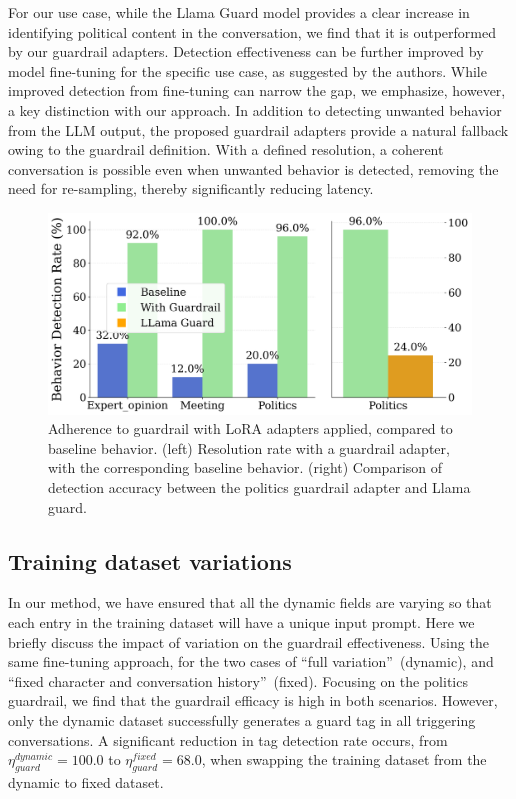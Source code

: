 \documentclass[letterpaper]{article}
\newcommand{\tagDetectionPoliticsFixed}{68.0}
\newcommand{\tagDetectionPolitics}{100.0}
\begin{document}
For our use case, while the Llama Guard model provides a clear increase in identifying political content in the conversation, we find that it is outperformed by our guardrail adapters.
Detection effectiveness can be further improved by model fine-tuning for the specific use case, as suggested by the authors. While improved detection from fine-tuning can narrow the gap, we emphasize, however, a key distinction with our approach. In addition to detecting unwanted behavior from the LLM output, the proposed guardrail adapters provide a natural fallback owing to the guardrail definition. With a defined resolution, a coherent conversation is possible even when unwanted behavior is detected, removing the need for re-sampling, thereby significantly reducing latency.

\begin{figure}[h!]
	\centering
	\includegraphics[width=1.0\linewidth]{figures/detectionEfficiencySingle.png}
	\caption{Adherence to guardrail with LoRA adapters applied, compared to baseline behavior. 
		(left)  Resolution rate with a guardrail adapter, with the corresponding baseline behavior. 
		(right)  Comparison of detection accuracy between the politics guardrail adapter and Llama guard.}\label{fig:llora-result}
\end{figure}
\subsection{Training dataset variations}
In our method, we have ensured that all the dynamic fields are varying so that each entry in the training dataset will have a unique input prompt. 
Here we briefly discuss the impact of variation on the guardrail effectiveness. 
Using the same fine-tuning approach, for the two cases of ``full variation''~(dynamic),  and ``fixed character and conversation history''~(fixed). 
Focusing on the politics guardrail, we find that the guardrail efficacy is high in both scenarios. However, only the dynamic dataset successfully generates a guard tag in all triggering conversations.
A significant reduction in tag detection rate occurs, from $\eta_{guard}^{dynamic} = \tagDetectionPolitics$ to $\eta_{guard}^{fixed} = \tagDetectionPoliticsFixed$, when swapping the training dataset from the dynamic to fixed dataset.
\end{document}
